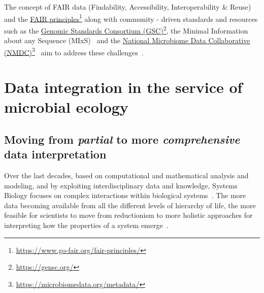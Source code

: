       The concept of FAIR data (Findability, Accessibility, Interoperability \& Reuse)
      and the \href{https://www.go-fair.org/fair-principles/}{FAIR principles}\footnote{\href{https://www.go-fair.org/fair-principles/}{https://www.go-fair.org/fair-principles/}}
      along with community - driven standards and resources such as 
      the \href{https://gensc.org/}{Genomic Standards Consortium (GSC)}\footnote{\href{https://gensc.org/}{https://gensc.org/}},
      the Minimal Information about any Sequence (MIxS)~\cite{yilmaz2011minimum, yilmaz2011genomic}
      and the \href{https://microbiomedata.org/metadata/}{National Microbiome Data Collaborative (NMDC)}\footnote{\href{https://microbiomedata.org/metadata/}{https://microbiomedata.org/metadata/}}~\cite{wood2020national}
      aim to address these challenges~\cite{wilkinson2016fair}.



\section{Data integration in the service of microbial ecology}


   \subsection{Moving from \textit{partial} to more \textit{comprehensive} data interpretation}

      Over the last decades, based on
      computational and mathematical analysis and modeling,
      and by exploiting interdisciplinary data and knowledge, 
      Systems Biology focuses on complex interactions within biological systems~\cite{tavassoly2018systems}.
      The more data becoming available from all the different levels
      of hierarchy of life, the more feasible for scientists to 
      move from reductionism to more holistic approaches 
      for interpreting how the properties of a system emerge~\cite{noble2008music}.


